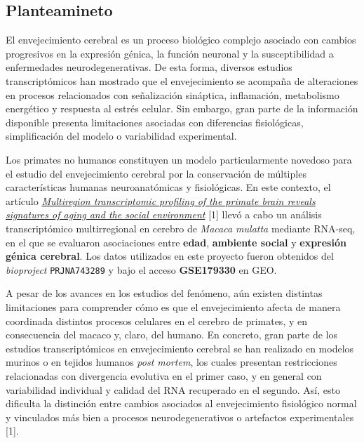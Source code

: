 \documentclass[
  12pt,
  letterpaper,
  DIV=11,
  numbers=noendperiod]{scrartcl}
\begin{document}
\subsection{Planteamineto}\label{planteamineto}

El envejecimiento cerebral es un proceso biológico complejo asociado con
cambios progresivos en la expresión génica, la función neuronal y la
susceptibilidad a enfermedades neurodegenerativas. De esta forma,
diversos estudios transcriptómicos han mostrado que el envejecimiento se
acompaña de alteraciones en procesos relacionados con señalización
sináptica, inflamación, metabolismo energético y respuesta al estrés
celular. Sin embargo, gran parte de la información disponible presenta
limitaciones asociadas con diferencias fisiológicas, simplificación del
modelo o variabilidad experimental.

Los primates no humanos constituyen un modelo particularmente novedoso
para el estudio del envejecimiento cerebral por la conservación de
múltiples características humanas neuroanatómicas y fisiológicas. En
este contexto, el artículo
\href{https://www.nature.com/articles/s41593-022-01197-0\#Sec45}{\emph{Multiregion
transcriptomic profiling of the primate brain reveals signatures of
aging and the social environment}} {[}1{]} llevó a cabo un análisis
transcriptómico multirregional en cerebro de \emph{Macaca mulatta}
mediante RNA-seq, en el que se evaluaron asociaciones entre
\textbf{edad}, \textbf{ambiente social} y \textbf{expresión génica
cerebral}. Los datos utilizados en este proyecto fueron obtenidos del
\emph{bioproject} \texttt{PRJNA743289} y bajo el acceso
\textbf{GSE179330} en GEO.

A pesar de los avances en los estudios del fenómeno, aún existen
distintas limitaciones para comprender cómo es que el envejecimiento
afecta de manera coordinada distintos procesos celulares en el cerebro
de primates, y en consecuencia del macaco y, claro, del humano. En
concreto, gran parte de los estudios transcriptómicos en envejecimiento
cerebral se han realizado en modelos murinos o en tejidos humanos
\emph{post mortem}, los cuales presentan restricciones relacionadas con
divergencia evolutiva en el primer caso, y en general con variabilidad
individual y calidad del RNA recuperado en el segundo. Así, esto
dificulta la distinción entre cambios asociados al envejecimiento
fisiológico normal y vinculados más bien a procesos neurodegenerativos o
artefactos experimentales {[}1{]}.
\end{document}
